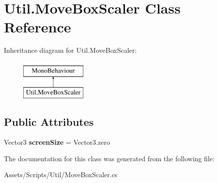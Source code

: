 \hypertarget{class_util_1_1_move_box_scaler}{}\section{Util.\+Move\+Box\+Scaler Class Reference}
\label{class_util_1_1_move_box_scaler}
Inheritance diagram for Util.\+Move\+Box\+Scaler\+:\begin{figure}[H]
\begin{center}
\leavevmode
\includegraphics[height=2.000000cm]{class_util_1_1_move_box_scaler}
\end{center}
\end{figure}
\subsection*{Public Attributes}
\begin{DoxyCompactItemize}
\item 
Vector3 {\bfseries screen\+Size} = Vector3.\+zero\hypertarget{class_util_1_1_move_box_scaler_a1fc06e802058cf45f851520b8b4b644f}{}\label{class_util_1_1_move_box_scaler_a1fc06e802058cf45f851520b8b4b644f}

\end{DoxyCompactItemize}


The documentation for this class was generated from the following file\+:\begin{DoxyCompactItemize}
\item 
Assets/\+Scripts/\+Util/Move\+Box\+Scaler.\+cs\end{DoxyCompactItemize}
